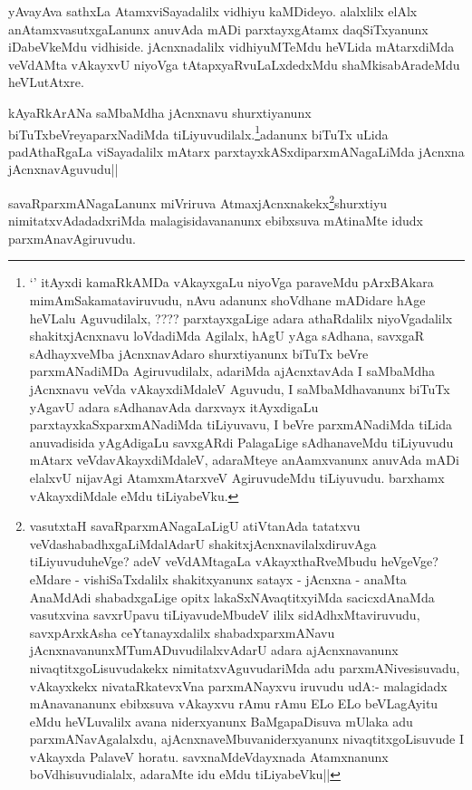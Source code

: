 
\begin{artha}
yAvayAva sathxLa AtamxviSayadalilx vidhiyu kaMDideyo. alalxlilx elAlx anAtamxvasutxgaLanunx anuvAda mADi parxtayxgAtamx daqSiTxyanunx iDabeVkeMdu vidhiside. jAcnxnadalilx vidhiyuMTeMdu heVLida mAtarxdiMda veVdAMta vAkayxvU niyoVga tAtapxyaRvuLaLxdedxMdu shaMkisabAradeMdu heVLutAtxre. 
\end{artha}


\begin{artha}
kAyaRkArANa saMbaMdha jAcnxnavu shurxtiyanunx biTuTxbeVreyaparxNadiMda tiLiyuvudilalx.\footnote{`\stext' itAyxdi kamaRkAMDa vAkayxgaLu niyoVga paraveMdu pArxBAkara mimAmSakamataviruvudu, nAvu adanunx shoVdhane mADidare hAge heVLalu Aguvudilalx, ????  parxtayxgaLige adara athaRdalilx niyoVgadalilx shakitxjAcnxnavu loVdadiMda Agilalx, hAgU yAga sAdhana, savxgaR sAdhayxveMba jAcnxnavAdaro shurxtiyanunx biTuTx beVre parxmANadiMDa Agiruvudilalx, adariMda ajAcnxtavAda I saMbaMdha jAcnxnavu veVda vAkayxdiMdaleV Aguvudu, I saMbaMdhavanunx biTuTx yAgavU adara sAdhanavAda darxvayx itAyxdigaLu parxtayxkaSxparxmANadiMda tiLiyuvavu, I beVre parxmANadiMda tiLida anuvadisida yAgAdigaLu savxgARdi PalagaLige sAdhanaveMdu tiLiyuvudu mAtarx veVdavAkayxdiMdaleV, adaraMteye anAamxvanunx anuvAda mADi elalxvU nijavAgi AtamxmAtarxveV AgiruvudeMdu tiLiyuvudu. barxhamx vAkayxdiMdale eMdu tiLiyabeVku.}adanunx biTuTx uLida padAthaRgaLa viSayadalilx mAtarx parxtayxkASxdiparxmANagaLiMda jAcnxna jAcnxnavAguvudu||
\end{artha}

\begin{artha}
savaRparxmANagaLanunx miVriruva AtmaxjAcnxnakekx\footnote[2]{vasutxtaH savaRparxmANagaLaLigU atiVtanAda tatatxvu veVdashabadhxgaLiMdalAdarU shakitxjAcnxnavilalxdiruvAga tiLiyuvuduheVge? adeV veVdAMtagaLa vAkayxthaRveMbudu heVgeVge? eMdare - vishiSaTxdalilx shakitxyanunx satayx - jAcnxna - anaMta AnaMdAdi shabadxgaLige opitx lakaSxNAvaqtitxyiMda sacicxdAnaMda vasutxvina savxrUpavu tiLiyavudeMbudeV ililx sidAdhxMtaviruvudu, savxpArxkAsha ceYtanayxdalilx shabadxparxmANavu jAcnxnavanunxMTumADuvudilalxvAdarU adara ajAcnxnavanunx nivaqtitxgoLisuvudakekx nimitatxvAguvudariMda adu parxmANivesisuvadu, vAkayxkekx nivataRkatevxVna parxmANayxvu iruvudu udA:- malagidadx mAnavananunx ebibxsuva vAkayxvu rAmu rAmu ELo ELo beVLagAyitu eMdu heVLuvalilx avana niderxyanunx BaMgapaDisuva mUlaka adu parxmANavAgalalxdu, ajAcnxnaveMbuvaniderxyanunx nivaqtitxgoLisuvude I vAkayxda PalaveV horatu. savxnaMdeVdayxnada Atamxnanunx boVdhisuvudialalx, adaraMte idu eMdu tiLiyabeVku||}shurxtiyu nimitatxvAdadadxriMda 
malagisidavananunx ebibxsuva mAtinaMte idudx parxmAnavAgiruvudu.
\end{artha}


